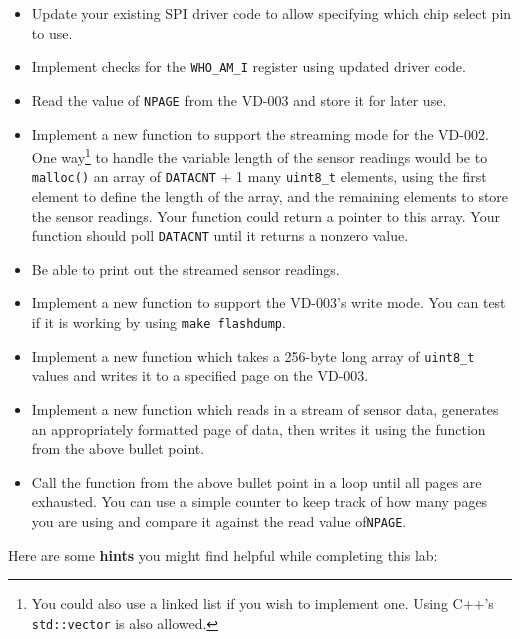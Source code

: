 \documentclass{article}
\begin{document}
\begin{itemize}

	\item Update your existing SPI driver code to allow specifying which
		chip select pin to use.

	\item Implement checks for the \texttt{WHO\_AM\_I} register using
		updated driver code.

	\item Read the value of \texttt{NPAGE} from the VD-003 and store it for
		later use.

	\item Implement a new function to support the streaming mode for the
		VD-002. One way\footnote{You could also use a linked list if
		you wish to implement one. Using C++'s \texttt{std::vector} is
		also allowed.} to handle the variable length of the sensor
		readings would be to \texttt{malloc()} an array of
		\texttt{DATACNT} + 1 many \texttt{uint8\_t} elements, using the
		first element to define the length of the array, and the
		remaining elements to store the sensor readings. Your function
		could return a pointer to this array. Your function should
		poll \texttt{DATACNT} until it returns a nonzero value.

	\item Be able to print out the streamed sensor readings.

	\item Implement a new function to support the VD-003's write mode. You
		can test if it is working by using \texttt{make flashdump}.

	\item Implement a new function which takes a 256-byte long array of
		\texttt{uint8\_t} values and writes it to a specified page on
		the VD-003.

	\item Implement a new function which reads in a stream of sensor data,
		generates an appropriately formatted page of data, then writes
		it using the function from the above bullet point.

	\item Call the function from the above bullet point in a loop until all
		pages are exhausted. You can use a simple counter to keep track
		of how many pages you are using and compare it against the read
		value of\texttt{NPAGE}.

\end{itemize}

Here are some \textbf{hints} you might find helpful while completing this lab:
\end{document}
